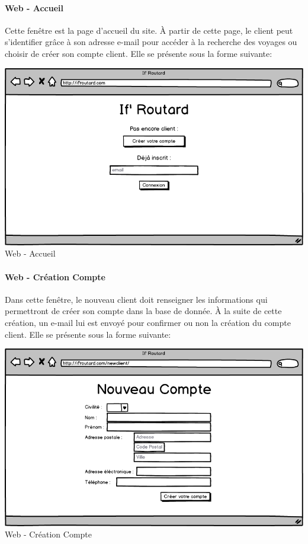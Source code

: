 \documentclass[11pt]{article}
\begin{document}
\paragraph{Web - Accueil}
Cette fenêtre est la page d'accueil du site. À partir de cette page, le client peut s'identifier grâce à son adresse e-mail pour accéder à la recherche des voyages ou choisir de créer son compte client. Elle se présente sous la forme suivante: 
\begin{center}
\includegraphics[scale = 0.4]{../Conception_graphique/png_Pour_CR/Web-00-Accueil.png}
\newline
Web - Accueil
\label{fig:Web-Accueil}
\end{center}

\paragraph{Web - Création Compte}
Dans cette fenêtre, le nouveau client doit renseigner les informations qui permettront de créer son compte dans la base de donnée. À la suite de cette création, un e-mail lui est envoyé pour	 confirmer ou non la création du compte client. Elle se présente sous la forme suivante:
\begin{center}
\includegraphics[scale = 0.4]{../Conception_graphique/png_Pour_CR/Web-10-Creation_Compte.png}
\newline
Web - Création Compte
\label{fig:Creation-Compte}
\end{center}
\end{document}
